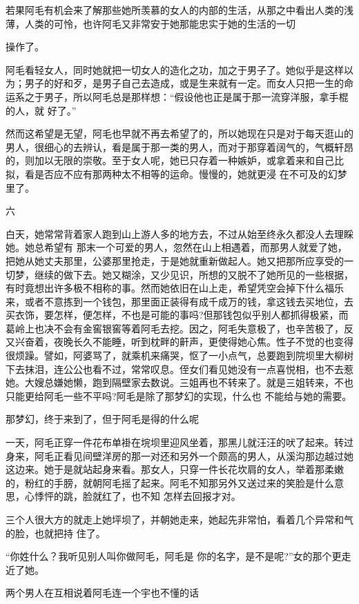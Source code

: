 \documentclass{article}
\begin{document}
若果阿毛有机会来了解那些她所羡慕的女人的内部的生活，从那之中看出人类的浅薄，人类的可怜，也许阿毛又非常安于她那能忠实于她的生活的一切
\newpage

操作了。 

阿毛看轻女人，同时她就把一切女人的造化之功，加之于男子了。她似乎是这样以为；男子的好和歹，是男子自己去造成，或是生来就有一定。而女人只把一生的命运系之于男子，所以阿毛总是那样想：“假设他也正是属于那一流穿洋服，拿手棍的人，就
好了。” 

然而这希望是无望，阿毛也早就不再去希望了的，所以她现在只是对于每天逛山的男人，很细心的去辨认，看是属于那一类的男人，而对于那穿着阔气的，气概轩昂的，则加以无限的崇敬。至于女人呢，她已只存着一种嫉妒，或拿着来和自己比拟，看是否应不应有那两种太不相等的运命。慢慢的，她就更浸
在不可及的幻梦里了。 


六 

白天，她常常背着家人跑到山上游人多的地方去，不过从始至终永久都没人去理睬她。她总希望有
\newpage
那末一个可爱的男人，忽然在山上相遇着，而那男人就爱了她，把她从她丈夫那里，公婆那里抢走，于是她就重新做起人。她又把那所应享受的一切梦，继续的做下去。她又糊涂，又少见识，所想的又脱不了她所见的一些根据，有时竟想出许多极不相称的事。然而她依旧在山上走，希望凭空会掉下什么福乐来，或者不意拣到一个钱包，那里面正装得有成千成万的钱，拿这钱去买地位，去买衣饰，要怎样，便怎样，不也是可能的事吗?但那钱包似乎别人都抓得极紧，而葛岭上也决不会有金窖银窖等着阿毛去挖。因之，阿毛失意极了，也辛苦极了，反又兴奋着，夜晚长久不能睡，听到枕畔的鼾声，更使得她心焦。性子不觉的也变得很烦躁。譬如，阿婆骂了，就乘机来痛哭，怄了一小点气，总要跑到院坝里大柳树下去抹泪，连公公也看不过，常常叹息。侄女们看见她没有一点喜悦相，也不去惹她。大嫂总嫌她懒，跑到隔壁家去数说。三姐再也不转来了。就是三姐转来，不也只能更给阿毛一些不平吗?阿毛是除了那梦幻的实现，什么也
不能给与她的需要。 

那梦幻，终于来到了，但于阿毛是得的什么呢
\newpage


一天，阿毛正穿一件花布单褂在垸坝里迎风坐着，那黑儿就汪汪的吠了起来。转过身来，阿毛正看见间壁洋房的那一对还和另外一个颇高的男人，从溪沟那边越过她这边来。她于是就站起身来看。那女人，只穿一件长花坎肩的女人，举着那柔嫩的，粉红的手膀，就朝阿毛摇了起来。阿毛不知那另外又送过来的笑脸是什么意思，心悸怦的跳，脸就红了，也不知
怎样去回报才对。 

三个人很大方的就走上她坪坝了，并朝她走来，她起先非常怕，看着几个异常和气的脸，也就把持
住了。 

“你姓什么？我听见别人叫你做阿毛，阿毛是
你的名字，是不是呢?”女的那个更走近了她。 

两个男人在互相说着阿毛连一个宇也不懂的话
\end{document}
